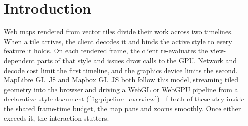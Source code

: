 
\section{Introduction}\label{sec:intro}

Web maps rendered from vector tiles divide their work across two timelines.
When a tile arrives, the client decodes it and binds the active style to every feature it holds.
On each rendered frame, the client re-evaluates the view-dependent parts of that style and issues draw calls to the GPU.
Network and decode cost limit the first timeline, and the graphics device limits the second.
MapLibre GL~JS and Mapbox GL~JS both follow this model, streaming tiled geometry into the browser and driving a WebGL or WebGPU pipeline from a declarative style document (\cref{fig:pipeline_overview}).
If both of these stay inside the shared frame-time budget, the map pans and zooms smoothly.
Once either exceeds it, the interaction stutters.

